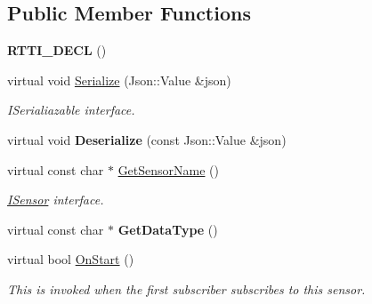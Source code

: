 \subsection*{Public Member Functions}
\begin{DoxyCompactItemize}
\item 
\mbox{\label{class_depth_camera_a65ba6b900f13d75408d1fbb90e2b1b01}} 
{\bfseries R\+T\+T\+I\+\_\+\+D\+E\+CL} ()
\item 
\mbox{\label{class_depth_camera_a70f1c1dca8591622d6c92dfde5d5c4e4}} 
virtual void \hyperlink{class_depth_camera_a70f1c1dca8591622d6c92dfde5d5c4e4}{Serialize} (Json\+::\+Value \&json)
\begin{DoxyCompactList}\small\item\em I\+Serialiazable interface. \end{DoxyCompactList}\item 
\mbox{\label{class_depth_camera_aafde1d8d16bf2dd14c303729929df0cc}} 
virtual void {\bfseries Deserialize} (const Json\+::\+Value \&json)
\item 
\mbox{\label{class_depth_camera_aadd17c5e675559f14c42663902fd10e6}} 
virtual const char $\ast$ \hyperlink{class_depth_camera_aadd17c5e675559f14c42663902fd10e6}{Get\+Sensor\+Name} ()
\begin{DoxyCompactList}\small\item\em \hyperlink{class_i_sensor}{I\+Sensor} interface. \end{DoxyCompactList}\item 
\mbox{\label{class_depth_camera_ac05b35efb90d7beace0cd8bb9c22064c}} 
virtual const char $\ast$ {\bfseries Get\+Data\+Type} ()
\item 
\mbox{\label{class_depth_camera_a6374182e6de29c0920e54779f9d12be0}} 
virtual bool \hyperlink{class_depth_camera_a6374182e6de29c0920e54779f9d12be0}{On\+Start} ()
\begin{DoxyCompactList}\small\item\em This is invoked when the first subscriber subscribes to this sensor. \end{DoxyCompactList}\item 
\mbox{\label{class_depth_camera_a9a1f1276865887d32898f6e97dfaffea}} 

\end{DoxyCompactItemize}
